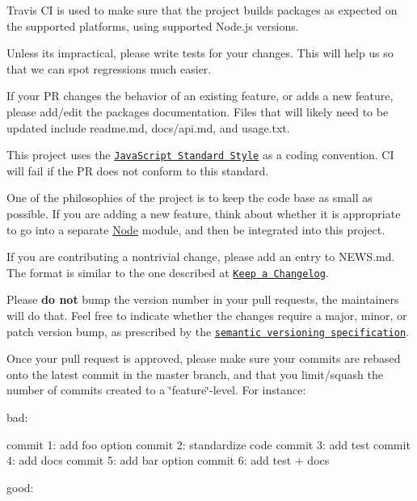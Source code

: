 \begin{DoxyItemize}
\item Travis CI is used to make sure that the project builds packages as expected on the supported platforms, using supported Node.\+js versions.
\item Unless it\textquotesingle{}s impractical, please write tests for your changes. This will help us so that we can spot regressions much easier.
\item If your PR changes the behavior of an existing feature, or adds a new feature, please add/edit the package\textquotesingle{}s documentation. Files that will likely need to be updated include {\ttfamily readme.\+md}, {\ttfamily docs/api.\+md}, and {\ttfamily usage.\+txt}.
\item This project uses the \href{https://www.npmjs.com/package/standard}{\tt Java\+Script Standard Style} as a coding convention. CI will fail if the PR does not conform to this standard.
\item One of the philosophies of the project is to keep the code base as small as possible. If you are adding a new feature, think about whether it is appropriate to go into a separate \mbox{\hyperlink{classNode}{Node}} module, and then be integrated into this project.
\item If you are contributing a nontrivial change, please add an entry to {\ttfamily N\+E\+W\+S.\+md}. The format is similar to the one described at \href{http://keepachangelog.com/}{\tt Keep a Changelog}.
\item Please {\bfseries do not} bump the version number in your pull requests, the maintainers will do that. Feel free to indicate whether the changes require a major, minor, or patch version bump, as prescribed by the \href{http://semver.org/}{\tt semantic versioning specification}.
\item Once your pull request is approved, please make sure your commits are rebased onto the latest commit in the master branch, and that you limit/squash the number of commits created to a \char`\"{}feature\char`\"{}-\/level. For instance\+:
\end{DoxyItemize}

bad\+:


\begin{DoxyCode}
commit 1: add foo option
commit 2: standardize code
commit 3: add test
commit 4: add docs
commit 5: add bar option
commit 6: add test + docs
\end{DoxyCode}


good\+:


